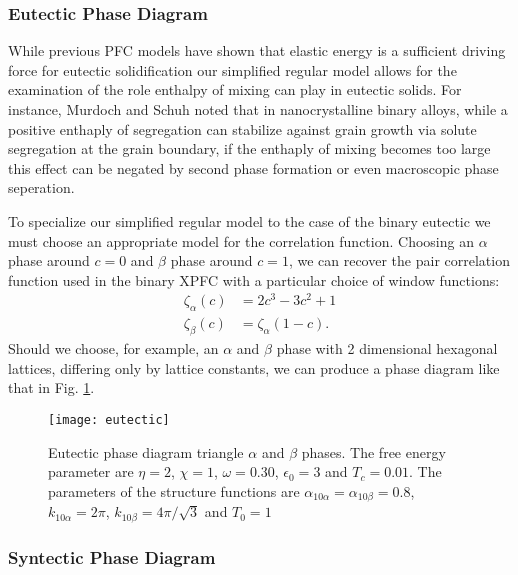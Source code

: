 \subsubsection{Eutectic Phase Diagram} %

While previous PFC models have shown that elastic energy is a sufficient
driving force for eutectic solidification our simplified regular model allows
for the examination of the role enthalpy of mixing can play in eutectic solids.
For instance, Murdoch and Schuh noted that in nanocrystalline binary alloys,
while a positive enthaply of segregation can stabilize against grain growth via
solute segregation at the grain boundary, if the enthaply of mixing becomes too
large this effect can be negated by second phase formation or even macroscopic
phase seperation\cite{MURDOCH13}. 

To specialize our simplified regular model to the case of the binary eutectic
we must choose an appropriate model for the correlation function. Choosing an
$\alpha$ phase around $c = 0$ and $\beta$ phase around $c = 1$, we can recover
the pair correlation function used in the binary XPFC with a
particular choice of window functions: 
%
\begin{align}
   \zeta_\alpha(c) &= 2c^3 - 3c^2 + 1 \\
   \zeta_\beta(c) &= \zeta_\alpha(1 - c).
\end{align}
%
Should we choose, for example, an $\alpha$ and $\beta$ phase with 2 dimensional
hexagonal lattices, differing only by lattice constants, we can produce a phase
diagram like that in Fig. \ref{eutectic}.  

\begin{figure}[h]
    \centering	
    \texttt{[image: eutectic]}
    \caption{
        \label{eutectic} Eutectic phase diagram triangle $\alpha$ and $\beta$
        phases. The free energy parameter are $\eta = 2$, $\chi = 1$,
        $\omega=0.30$, $\epsilon_0 = 3$ and $T_c = 0.01$. The parameters of the
        structure functions are $\alpha_{10\alpha} = \alpha_{10\beta} = 0.8$,
        $k_{10\alpha} = 2\pi$, $k_{10\beta} = 4\pi/\sqrt{3}$ and $T_0 = 1$
    }
\end{figure}

\subsubsection{Syntectic Phase Diagram} %

